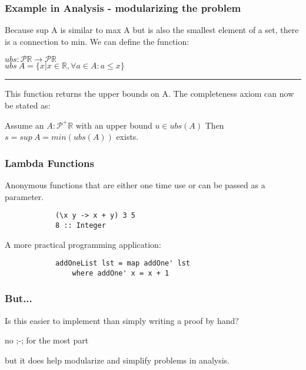 \documentclass[handout]{beamer}
\newcommand{\R}{\mathbb{R}}
\begin{document}
    \begin{frame}
        \frametitle{Example in Analysis - modularizing the problem}

        Because sup A is similar to max A but is also the smallest element of a set, there is a connection to min. We can define the function:

        $ubs: \mathcal{P}\R \rightarrow \mathcal{P}\R$\\
        $ubs\ A = \{x | x \in \R, \forall a \in A : a \leq x\}$

        \rule{\textwidth}{0.5mm}

        This function returns the upper bounds on A. The completeness axiom can now be stated as:

        Assume an $A: \mathcal{P}^+\R$ with an upper bound $u \in ubs(A)$
        Then $s = sup\ A = min(ubs(A))$ exists.
    \end{frame}

    \begin{frame}[fragile]
        \frametitle{Lambda Functions}

        Anonymous functions that are either one time use or can be passed as a parameter.

        \begin{verbatim}
            (\x y -> x + y) 3 5
            8 :: Integer
        \end{verbatim}

        A more practical programming application:

        \begin{verbatim}
            addOneList lst = map addOne' lst
                where addOne' x = x + 1
        \end{verbatim}
    \end{frame}

    \begin{frame}
        \frametitle{But...}

        \begin{center}
            Is this easier to implement than simply writing a proof by hand? \pause

            no ;-; for the most part

            \vspace{20px}

            but it does help modularize and simplify problems in analysis.
        \end{center}

    \end{frame}
\end{document}
